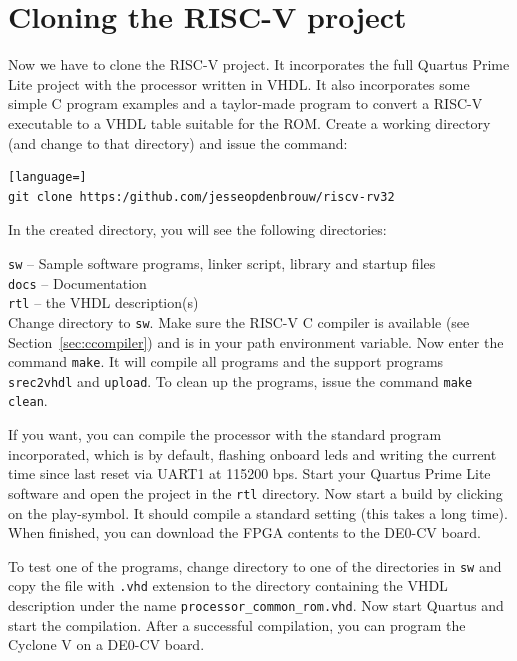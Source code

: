 \documentclass[12pt]{article}
\begin{document}
\section{Cloning the RISC-V project}
\label{sec:cloning}
Now we have to clone the RISC-V project. It incorporates the full Quartus Prime Lite project with the processor written in VHDL. It also incorporates some simple C program examples and a taylor-made program to convert a RISC-V executable to a VHDL table suitable for the ROM. Create a working directory (and change to that directory) and issue the command:

\begin{lstlisting}[language=]
git clone https:/github.com/jesseopdenbrouw/riscv-rv32
\end{lstlisting}

In the created directory, you will see the following directories:

\lstinline|sw| -- Sample software programs, linker script, library and startup files \\
\lstinline|docs| -- Documentation \\
\lstinline|rtl| -- the VHDL description(s) \\

Change directory to \lstinline|sw|. Make sure the RISC-V C compiler is available (see Section~\ref{sec:ccompiler}) and is in your path environment variable. Now enter the command \lstinline|make|. It will compile all programs and the support programs \lstinline|srec2vhdl| and \lstinline|upload|. To clean up the programs, issue the command \lstinline|make clean|.

If you want, you can compile the processor with the standard program incorporated, which is by default, flashing onboard leds and writing the current time since last reset via UART1 at 115200 bps. Start your Quartus Prime Lite software and open the project in the \lstinline|rtl| directory. Now start a build by clicking on the play-symbol. It should compile a standard setting (this takes a long time). When finished, you can download the FPGA contents to the DE0-CV board.

To test one of the programs, change directory to one of the directories in \lstinline|sw| and copy the file with \lstinline|.vhd| extension to the directory containing the VHDL description under the name \lstinline|processor_common_rom.vhd|.
Now start Quartus and start the compilation. After a successful compilation, you can program the Cyclone V on a DE0-CV board.
\end{document}
